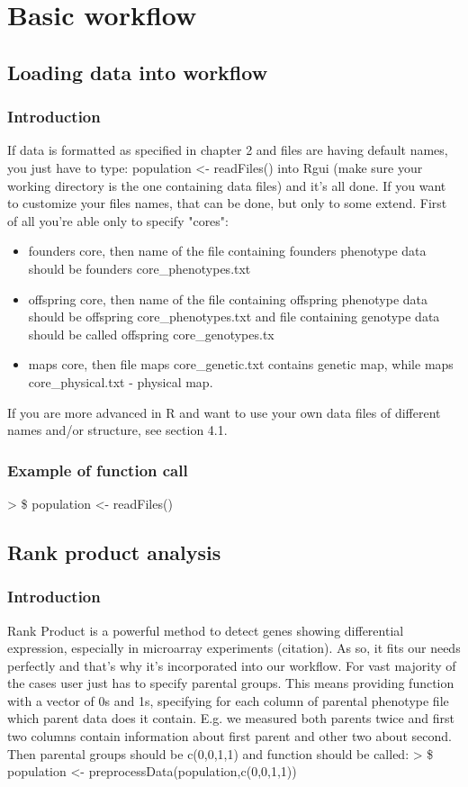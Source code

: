 \documentclass{article}
\begin{document}
\section{Basic workflow}
\subsection{Loading data into workflow}
\subsubsection{Introduction}
If data is formatted as specified in chapter 2 and files are having default names, you just have to type: population <-  readFiles() into Rgui (make sure your working directory is the one containing data files) and it's all done. If you want to customize your files names, that can be done, but only to some extend. First of all you're able only to specify "cores": 
\begin{itemize}
\item  founders core, then name of the file containing founders phenotype data should be founders core\_phenotypes.txt
\item  offspring core,  then name of the file containing offspring phenotype data should be offspring core\_phenotypes.txt and file containing genotype data should be called offspring core\_genotypes.tx
\item maps core, then file maps core\_genetic.txt contains genetic map, while maps core\_physical.txt - physical map.
\end{itemize}
If you are more advanced in R and want to use your own data files of different names and/or structure, see section 4.1.
\subsubsection{Example of function call}
> \$ population <- readFiles()
\subsection{Rank product analysis}
\subsubsection{Introduction}
Rank Product is a powerful method to detect genes showing differential expression, especially in microarray experiments (citation). As so, it fits our needs perfectly and that's why it's incorporated into our workflow. For vast majority of the cases user just has to specify parental groups. This means providing function with a vector of 0s and 1s, specifying for each column of parental phenotype file which parent data does it contain. E.g. we measured both parents twice and first two columns contain information about first parent and other two about second. Then parental groups should be c(0,0,1,1) and function should be called: >  \$ population <- preprocessData(population,c(0,0,1,1))
\end{document}
